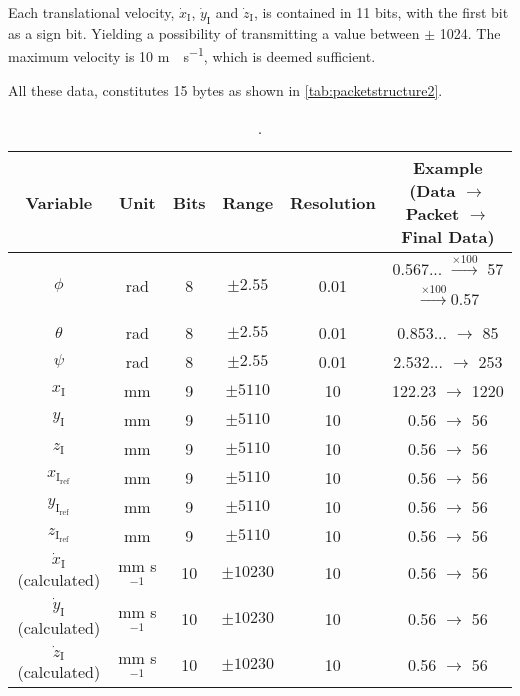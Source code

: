 Each translational velocity, $\dot{x}_{\mathrm{I}}$, $\dot{y}_{\mathrm{I}}$ and $\dot{z}_{\mathrm{I}}$, is contained in 11 bits, with the first bit as a sign bit. Yielding a possibility of transmitting a value between $\pm$ 1024. The maximum velocity is 10 \si{m \cdot s^{-1}}, which is deemed sufficient.

All these data, constitutes 15 bytes as shown in \autoref{tab:packetstructure2}.

\begin{table}[H]
    \centering
    \begin{tabular}{|c|c|c|c|c|c|}
        \hline
        Variable      &  Unit       &  Bits     & Range 	   & Resolution 	  & Example (Data $\rightarrow$ Packet $\rightarrow$ Final Data)		 \\ \hline
        $\phi$         & rad	 &	8    & $\pm 2.55$ & 0.01 & 0.567... $\xrightarrow[]{\times 100}$ 57$\xrightarrow[]{\times 100}$0.57\\ \hline
        $\theta$       & rad	&	8    & $\pm 2.55$ & 0.01 & 0.853... $\rightarrow$ 85\\ \hline
        $\psi$         & rad	&	8    & $\pm 2.55$ & 0.01 & 2.532... $\rightarrow$ 253\\ \hline
        $x_{\mathrm{I}}$         & mm	&  9  & $\pm 5110$ & 10  & 122.23 $\rightarrow$ 1220\\ \hline
        $y_{\mathrm{I}}$         & mm	&9	    & $\pm 5110$ & 10 & 0.56 $\rightarrow$ 56\\ \hline
        $z_{\mathrm{I}}$         & mm	&   9     & $\pm 5110$ & 10 & 0.56 $\rightarrow$ 56\\ \hline
        $x_{\mathrm{I_{ref}}}$     & mm	&9	    & $\pm 5110$ & 10 & 0.56 $\rightarrow$ 56\\ \hline
        $y_{\mathrm{I_{ref}}}$     & mm	& 9   & $\pm 5110$ & 10 &  0.56 $\rightarrow$ 56\\ \hline
        $z_{\mathrm{I_{ref}}}$     & mm 	&9	    & $\pm 5110$ & 10 & 0.56 $\rightarrow$ 56\\ \hline
        $\dot{x}_{\mathrm{I}}$ (calculated)  & mm s$^{-1}$		 &  10 & $\pm 10230$ & 10 & 0.56 $\rightarrow$ 56\\ \hline
        $\dot{y}_{\mathrm{I}}$ (calculated)  & 	mm s$^{-1}$	&  10  & $\pm 10230$ & 10 & 0.56 $\rightarrow$ 56\\ \hline
        $\dot{z}_{\mathrm{I}}$ (calculated)  & 	mm s$^{-1}$	&  10  & $\pm 10230$ & 10 & 0.56 $\rightarrow$ 56\\ \hline        
    \end{tabular}
    \caption{.}
    \label{tab:data}
\end{table}


